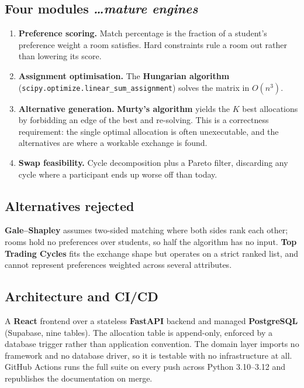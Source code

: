 \documentclass[11pt,a4paper]{article}
\newcommand{\BvrHint}[1]{%
  {\normalfont\normalsize\itshape\hfill #1}}
\begin{document}
\subsection{Four modules %
\BvrHint{\ldots mature engines}}
\begin{enumerate}[leftmargin=0.7cm]
    \item \textbf{Preference scoring.} Match percentage
      is the fraction of a student's preference weight a
      room satisfies. Hard constraints rule a room out
      rather than lowering its score.
    \item \textbf{Assignment optimisation.} The
      \textbf{Hungarian algorithm}
      (\texttt{scipy.optimize.linear\_sum\_assignment})
      solves the matrix in $O(n^3)$.
    \item \textbf{Alternative generation.}
      \textbf{Murty's algorithm} yields the $K$ best
      allocations by forbidding an edge of the best and
      re-solving. This is a correctness requirement: the
      single optimal allocation is often unexecutable,
      and the alternatives are where a workable exchange
      is found.
    \item \textbf{Swap feasibility.} Cycle decomposition
      plus a Pareto filter, discarding any cycle where a
      participant ends up worse off than today.
\end{enumerate}

\subsection{Alternatives rejected}
\textbf{Gale--Shapley} assumes two-sided matching where
both sides rank each other; rooms hold no preferences
over students, so half the algorithm has no input.
\textbf{Top Trading Cycles} fits the exchange shape but
operates on a strict ranked list, and cannot represent
preferences weighted across several attributes.

\subsection{Architecture and CI/CD}
A \textbf{React} frontend over a stateless
\textbf{FastAPI} backend and managed \textbf{PostgreSQL}
(Supabase, nine tables). The allocation table is
append-only, enforced by a database trigger rather than
application convention. The domain layer imports no
framework and no database driver, so it is testable with
no infrastructure at all. GitHub Actions runs the full
suite on every push across Python 3.10--3.12 and
republishes the documentation on merge.
\end{document}
